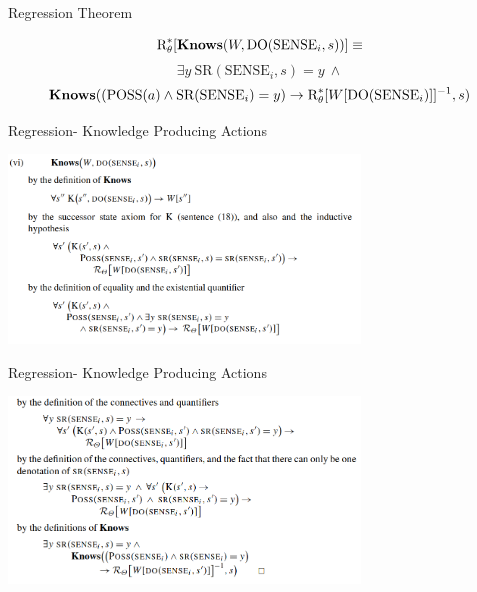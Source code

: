 \begin{frame}{Regression Theorem}

\begin{theorem}

    \[ \text{R}^*_{\theta}[\textbf{Knows}(W, \text{DO}(\text{SENSE}_i, s))] \equiv \]
    \[ \exists y \ \text{SR}(\text{SENSE}_i, s) = y \ \land \]       
    \[ \textbf{Knows}((\text{POSS}(a) \land \text{SR}(\text{SENSE}_i) = y) \rightarrow \text{R}^*_{\theta}[W[\text{DO}(\text{SENSE}_i)]]^{-1}, s) \]
\end{theorem}      
\end{frame}

\begin{frame}{Regression- Knowledge Producing Actions}

    \begin{center}
        \includegraphics[width=0.7\textwidth]{assets/proof1.png}
    \end{center}

\end{frame}

\begin{frame}{Regression- Knowledge Producing Actions}

    \begin{center}
        \includegraphics[width=0.7\textwidth]{assets/proof2.png}
    \end{center}

\end{frame}

